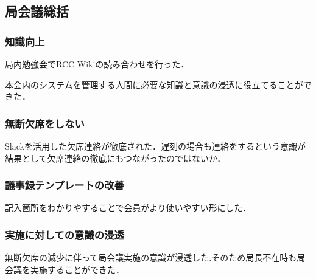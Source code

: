 \subsection*{局会議総括}


\subsubsection*{知識向上}

局内勉強会でRCC Wikiの読み合わせを行った．

本会内のシステムを管理する人間に必要な知識と意識の浸透に役立てることができた．

\subsubsection*{無断欠席をしない}

Slackを活用した欠席連絡が徹底された．遅刻の場合も連絡をするという意識が結果として欠席連絡の徹底にもつながったのではないか．

\subsubsection*{議事録テンプレートの改善}

記入箇所をわかりやすることで会員がより使いやすい形にした．

\subsubsection*{実施に対しての意識の浸透}

無断欠席の減少に伴って局会議実施の意識が浸透した.そのため局長不在時も局会議を実施することができた．
